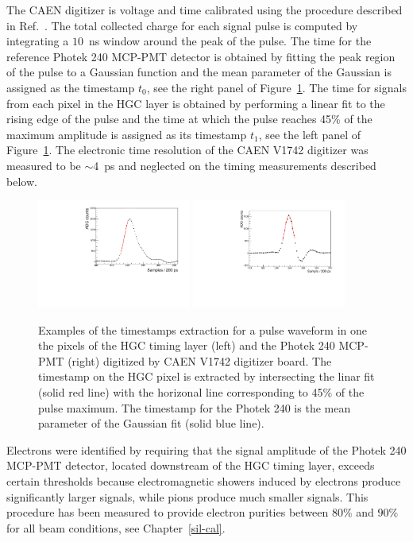 The CAEN digitizer is voltage and time calibrated using the  procedure
described in Ref.~\cite{Kim201467}. The total collected charge for each signal
pulse is computed by integrating a $10$~ns window around the peak of the pulse.
The time for the reference Photek 240 MCP-PMT detector is obtained by fitting the
peak region of the pulse to a Gaussian function and the mean parameter of the
Gaussian is assigned as the timestamp $t_0$, see the right panel of Figure~\ref{hgc:fits}. The time for signals from
each pixel in the HGC layer is obtained by performing a linear fit to the rising edge of the
pulse and the time at which the pulse reaches 45\% of the maximum amplitude is
assigned as its timestamp $t_1$, see the left panel of Figure~\ref{hgc:fits}. The electronic time resolution
of the CAEN V1742 digitizer was measured to be $\sim$4~ps and
neglected on the timing measurements described below.
\begin{figure}[h] 
\centering
\includegraphics[width=0.45\textwidth]{HGC/HGC_Pulse.pdf} 
\includegraphics[width=0.45\textwidth]{HGC/photek_pulse_fit.pdf} 
\caption{Examples of the timestamps extraction for a pulse waveform in
  one the pixels of the HGC timing layer (left) and
the Photek 240 MCP-PMT (right) digitized by CAEN V1742 digitizer
board. The timestamp on the HGC pixel is extracted by intersecting the
linar fit (solid red line) with the horizonal line corresponding to
45\% of the pulse maximum. The timestamp for the Photek 240 is the
mean parameter of the Gaussian fit (solid blue line).} 
\label{hgc:fits} 
\end{figure} 

Electrons were identified by requiring that the signal amplitude of
the Photek 240 MCP-PMT detector, located downstream of the HGC timing layer, exceeds certain thresholds because electromagnetic showers induced by electrons
produce significantly larger signals, while pions produce much smaller
signals. This procedure has been measured to provide electron purities
between $80\%$ and $90\%$ for all beam conditions, see
Chapter~\ref{sil-cal}.
